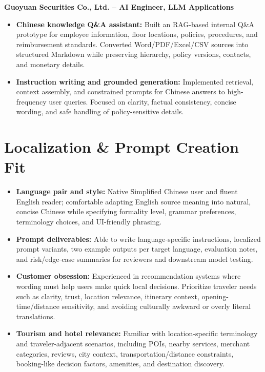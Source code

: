 \documentclass[a4paper,10pt]{article}
\newcommand{\resumeItem}[2]{
  {
    {\fontsize{9.8pt}{10.2pt}\selectfont\textbf{#1}}{ #2 \vspace{0pt}}
  }
}
\newcommand{\resumeSubItem}[2]{\resumeItem{#1}{#2}\vspace{0pt}}
\begin{document}
\resumeSubItem{Guoyuan Securities Co., Ltd. -- AI Engineer, LLM Applications}\hfill{Aug 2023 -- Oct 2023}
\begin{itemize}[leftmargin=*, itemsep=1.5pt, topsep=4pt]
\item \textbf{Chinese knowledge Q\&A assistant:} Built an RAG-based internal Q\&A prototype for employee information, floor locations, policies, procedures, and reimbursement standards. Converted Word/PDF/Excel/CSV sources into structured Markdown while preserving hierarchy, policy versions, contacts, and monetary details.
\item \textbf{Instruction writing and grounded generation:} Implemented retrieval, context assembly, and constrained prompts for Chinese answers to high-frequency user queries. Focused on clarity, factual consistency, concise wording, and safe handling of policy-sensitive details.
\end{itemize}

\vspace{-1pt}
\section{Localization \& Prompt Creation Fit}
\begin{itemize}[leftmargin=*, itemsep=3pt, topsep=1pt]
\item \textbf{Language pair and style:} Native Simplified Chinese user and fluent English reader; comfortable adapting English source meaning into natural, concise Chinese while specifying formality level, grammar preferences, terminology choices, and UI-friendly phrasing.
\item \textbf{Prompt deliverables:} Able to write language-specific instructions, localized prompt variants, two example outputs per target language, evaluation notes, and risk/edge-case summaries for reviewers and downstream model testing.
\item \textbf{Customer obsession:} Experienced in recommendation systems where wording must help users make quick local decisions. Prioritize traveler needs such as clarity, trust, location relevance, itinerary context, opening-time/distance sensitivity, and avoiding culturally awkward or overly literal translations.
\item \textbf{Tourism and hotel relevance:} Familiar with location-specific terminology and traveler-adjacent scenarios, including POIs, nearby services, merchant categories, reviews, city context, transportation/distance constraints, booking-like decision factors, amenities, and destination discovery.
\end{itemize}
\end{document}
